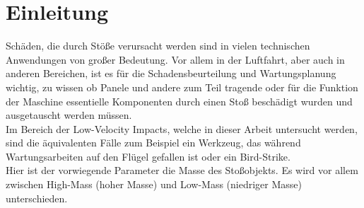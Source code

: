 \chapter{Einleitung}
\label{chap:Intro}

%
%
%


Schäden, die durch Stöße verursacht werden sind in vielen technischen Anwendungen von großer Bedeutung. Vor allem in der Luftfahrt, aber auch in anderen Bereichen, ist es für die Schadensbeurteilung und Wartungsplanung wichtig, zu wissen ob Panele und andere zum Teil tragende oder für die Funktion der Maschine essentielle Komponenten durch einen Stoß beschädigt wurden und ausgetauscht werden müssen. \\
Im Bereich der Low-Velocity Impacts, welche in dieser Arbeit untersucht werden, sind die äquivalenten Fälle zum Beispiel ein Werkzeug, das während Wartungsarbeiten auf den Flügel gefallen ist oder ein Bird-Strike. \\
Hier ist der vorwiegende Parameter die Masse des Stoßobjekts. Es wird vor allem zwischen High-Mass (hoher Masse) und Low-Mass (niedriger Masse) unterschieden. 